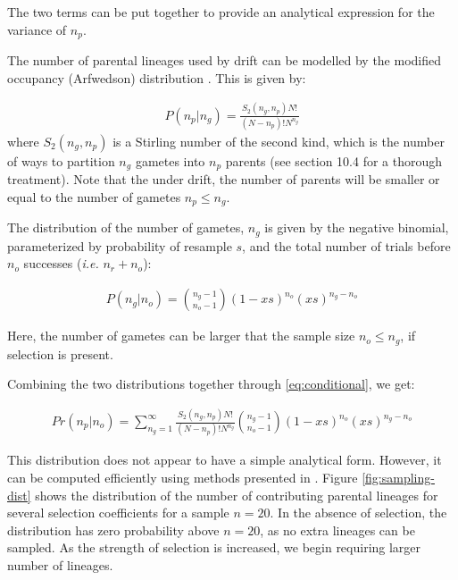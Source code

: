 \documentclass[review]{elsarticle}
\begin{document}
The two terms can be put together to provide an analytical expression for the variance of $n_p$. 




The number of parental lineages used by drift can be modelled by the modified occupancy
(Arfwedson) distribution \citep{Wakeley2009,ONeill2019,JohnsonEtAl2005}. This is given by:

\begin{align}
  \label{eq:occupancy}
  P(n_p|n_g) = \frac{S_2(n_g,n_p) N!}{(N-n_p)! N^{n_g}}
\end{align}
where $S_2(n_g,n_p)$ is a Stirling number of the second kind, which is the number of ways to partition
$n_g$ gametes into $n_p$ parents (see \cite{JohnsonEtAl2005} section 10.4 for a thorough treatment).
Note that the under drift, the number of parents will be smaller or equal to the number of gametes
$n_p \le n_g$.

The distribution of the number of gametes, $n_g$ is given by the negative binomial, parameterized by
probability of resample $s$, and the total number of trials before $n_o$ successes (\textit{i.e.}
$n_r+n_o$):

\begin{align}
  \label{eq:neg-binomial-trials}
  P(n_g|n_o) = \binom{n_g-1}{n_o-1}(1-xs)^{n_o}(xs)^{n_g-n_o}
\end{align}

Here, the number of gametes can be larger that the sample size $n_o \le n_g$, if selection is present.

Combining the two distributions together through \ref{eq:conditional}, we get:

\begin{align}
  \label{eq:lineages-in-past}
   Pr(n_p|n_o) = \sum_{n_g=1}^{\infty} \frac{S_2(n_g,n_p) N!}{(N-n_p)! N^{n_g}} \binom{n_g-1}{n_o-1}(1-xs)^{n_o}(xs)^{n_g-n_o}
\end{align}

This distribution does not appear to have a simple analytical form. However, it can be computed
efficiently using methods presented in \citep{ONeill2019}. Figure \ref{fig:sampling-dist} shows the
distribution of the number of contributing parental lineages for several selection coefficients for
a sample $n=20$. In the absence of selection, the distribution has zero probability above $n=20$, as
no extra lineages can be sampled. As the strength of selection is increased, we begin requiring
larger number of lineages.
\end{document}
